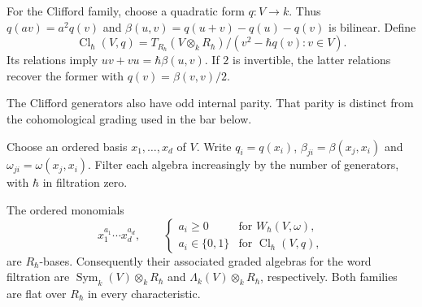 For the Clifford family, choose a quadratic form $q:V\to k$.
Thus $q(av)=a^2q(v)$ and
$\beta(u,v)=q(u+v)-q(u)-q(v)$ is bilinear.
Define
\[
 \operatorname{Cl}_\hbar(V,q)
 =T_{R_\hbar}(V\otimes_k R_\hbar)/(v^2-\hbar q(v):v\in V).
\]
Its relations imply $uv+vu=\hbar\beta(u,v)$.
If $2$ is invertible, the latter relations recover the former with $q(v)=\beta(v,v)/2$.

The Clifford generators also have odd internal parity.
That parity is distinct from the cohomological grading used in the bar below.

Choose an ordered basis $x_1,\ldots,x_d$ of $V$.
Write $q_i=q(x_i)$, $\beta_{ji}=\beta(x_j,x_i)$ and $\omega_{ji}=\omega(x_j,x_i)$.
Filter each algebra increasingly by the number of generators, with $\hbar$ in filtration zero.

\begin{theorem}\label{cbc:weyl:pbw}
The ordered monomials
\[
 x_1^{a_1}\cdots x_d^{a_d},\qquad
 \begin{cases}
 a_i\geq0&\text{for }W_\hbar(V,\omega),\\
 a_i\in\{0,1\}&\text{for }\operatorname{Cl}_\hbar(V,q),
 \end{cases}
\]
are $R_\hbar$-bases.
Consequently their associated graded algebras for the word filtration are
$\operatorname{Sym}_k(V)\otimes_k R_\hbar$ and
$\Lambda_k(V)\otimes_k R_\hbar$, respectively.
Both families are flat over $R_\hbar$ in every characteristic.
\end{theorem}
